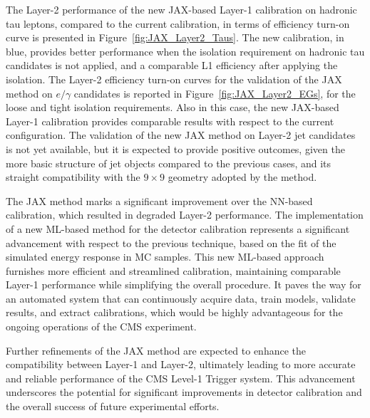 The Layer-2 performance of the new JAX-based Layer-1 calibration on hadronic tau leptons, compared to the current calibration, in terms of efficiency turn-on curve is presented in Figure~\ref{fig:JAX_Layer2_Taus}. The new calibration, in blue, provides better performance when the isolation requirement on hadronic tau candidates is not applied, and a comparable L1 efficiency after applying the isolation. 
The Layer-2 efficiency turn-on curves for the validation of the JAX method on $e/\gamma$ candidates is reported in Figure~\ref{fig:JAX_Layer2_EGs}, for the loose and tight isolation requirements. 
Also in this case, the new JAX-based Layer-1 calibration provides comparable results with respect to the current configuration.
The validation of the new JAX method on Layer-2 jet candidates is not yet available, but it is expected to provide positive outcomes, given the more basic structure of jet objects compared to the previous cases, and its straight compatibility with the $9\times9$ geometry adopted by the method.

\bigbreak

The JAX method marks a significant improvement over the NN-based calibration, which resulted in degraded Layer-2 performance.
The implementation of a new ML-based method for the detector calibration represents a significant advancement with respect to the previous technique, based on the fit of the simulated energy response in MC samples. This new ML-based approach furnishes more efficient and streamlined calibration, maintaining comparable Layer-1 performance while simplifying the overall procedure.
It paves the way for an automated system that can continuously acquire data, train models, validate results, and extract calibrations, which would be highly advantageous for the ongoing operations of the CMS experiment.

Further refinements of the JAX method are expected to enhance the compatibility between Layer-1 and Layer-2, ultimately leading to more accurate and reliable performance of the CMS Level-1 Trigger system. This advancement underscores the potential for significant improvements in detector calibration and the overall success of future experimental efforts.

